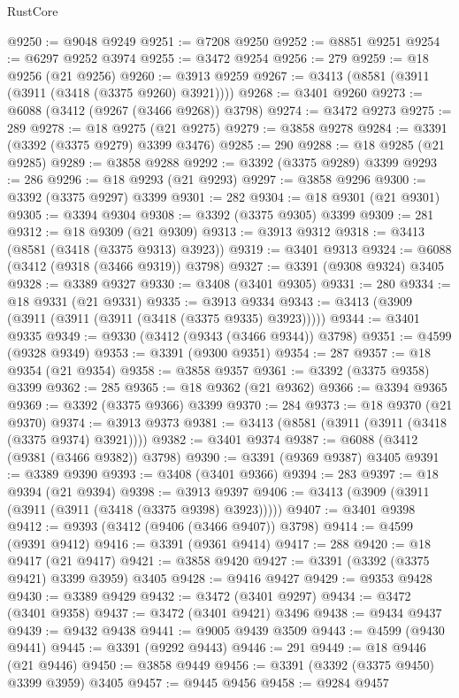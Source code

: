 \begin{lexlean}{RustCore}
\begin{coremodule}
@9250 := @9048 @9249
@9251 := @7208 @9250
@9252 := @8851 @9251
@9254 := @6297 @9252 @3974
@9255 := @3472 @9254
@9256 := 279
@9259 := @18 @9256 (@21 @9256)
@9260 := @3913 @9259
@9267 := @3413 (@8581 (@3911 (@3911 (@3418 (@3375 @9260) @3921))))
@9268 := @3401 @9260
@9273 := @6088 (@3412 (@9267 (@3466 @9268)) @3798)
@9274 := @3472 @9273
@9275 := 289
@9278 := @18 @9275 (@21 @9275)
@9279 := @3858 @9278
@9284 := @3391 (@3392 (@3375 @9279) @3399 @3476)
@9285 := 290
@9288 := @18 @9285 (@21 @9285)
@9289 := @3858 @9288
@9292 := @3392 (@3375 @9289) @3399
@9293 := 286
@9296 := @18 @9293 (@21 @9293)
@9297 := @3858 @9296
@9300 := @3392 (@3375 @9297) @3399
@9301 := 282
@9304 := @18 @9301 (@21 @9301)
@9305 := @3394 @9304
@9308 := @3392 (@3375 @9305) @3399
@9309 := 281
@9312 := @18 @9309 (@21 @9309)
@9313 := @3913 @9312
@9318 := @3413 (@8581 (@3418 (@3375 @9313) @3923))
@9319 := @3401 @9313
@9324 := @6088 (@3412 (@9318 (@3466 @9319)) @3798)
@9327 := @3391 (@9308 @9324) @3405
@9328 := @3389 @9327
@9330 := @3408 (@3401 @9305)
@9331 := 280
@9334 := @18 @9331 (@21 @9331)
@9335 := @3913 @9334
@9343 := @3413 (@3909 (@3911 (@3911 (@3911 (@3418 (@3375 @9335) @3923)))))
@9344 := @3401 @9335
@9349 := @9330 (@3412 (@9343 (@3466 @9344)) @3798)
@9351 := @4599 (@9328 @9349)
@9353 := @3391 (@9300 @9351)
@9354 := 287
@9357 := @18 @9354 (@21 @9354)
@9358 := @3858 @9357
@9361 := @3392 (@3375 @9358) @3399
@9362 := 285
@9365 := @18 @9362 (@21 @9362)
@9366 := @3394 @9365
@9369 := @3392 (@3375 @9366) @3399
@9370 := 284
@9373 := @18 @9370 (@21 @9370)
@9374 := @3913 @9373
@9381 := @3413 (@8581 (@3911 (@3911 (@3418 (@3375 @9374) @3921))))
@9382 := @3401 @9374
@9387 := @6088 (@3412 (@9381 (@3466 @9382)) @3798)
@9390 := @3391 (@9369 @9387) @3405
@9391 := @3389 @9390
@9393 := @3408 (@3401 @9366)
@9394 := 283
@9397 := @18 @9394 (@21 @9394)
@9398 := @3913 @9397
@9406 := @3413 (@3909 (@3911 (@3911 (@3911 (@3418 (@3375 @9398) @3923)))))
@9407 := @3401 @9398
@9412 := @9393 (@3412 (@9406 (@3466 @9407)) @3798)
@9414 := @4599 (@9391 @9412)
@9416 := @3391 (@9361 @9414)
@9417 := 288
@9420 := @18 @9417 (@21 @9417)
@9421 := @3858 @9420
@9427 := @3391 (@3392 (@3375 @9421) @3399 @3959) @3405
@9428 := @9416 @9427
@9429 := @9353 @9428
@9430 := @3389 @9429
@9432 := @3472 (@3401 @9297)
@9434 := @3472 (@3401 @9358)
@9437 := @3472 (@3401 @9421) @3496
@9438 := @9434 @9437
@9439 := @9432 @9438
@9441 := @9005 @9439 @3509
@9443 := @4599 (@9430 @9441)
@9445 := @3391 (@9292 @9443)
@9446 := 291
@9449 := @18 @9446 (@21 @9446)
@9450 := @3858 @9449
@9456 := @3391 (@3392 (@3375 @9450) @3399 @3959) @3405
@9457 := @9445 @9456
@9458 := @9284 @9457

\end{coremodule}
\end{lexlean}
